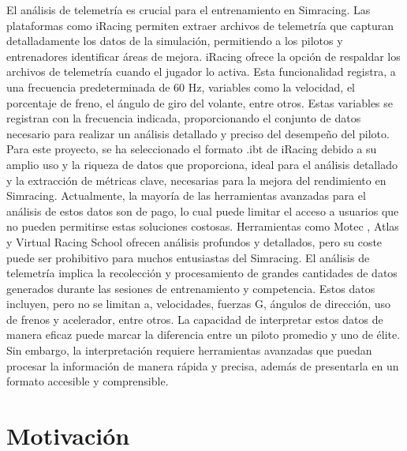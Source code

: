 El análisis de telemetría es crucial para el entrenamiento en Simracing. Las plataformas como iRacing permiten extraer archivos de telemetría que capturan detalladamente los datos de la simulación, permitiendo a los pilotos y entrenadores identificar áreas de mejora. iRacing ofrece la opción de respaldar los archivos de telemetría cuando el jugador lo activa. Esta funcionalidad registra, a una frecuencia predeterminada de 60 Hz, variables como la velocidad, el porcentaje de freno, el ángulo de giro del volante, entre otros. Estas variables se registran con la frecuencia indicada, proporcionando el conjunto de datos necesario para realizar un análisis detallado y preciso del desempeño del piloto.
Para este proyecto, se ha seleccionado el formato .ibt de iRacing debido a su amplio uso y la riqueza de datos que proporciona, ideal para el análisis detallado y la extracción de métricas clave, necesarias para la mejora del rendimiento en Simracing.
Actualmente, la mayoría de las herramientas avanzadas para el análisis de estos datos son de pago, lo cual puede limitar el acceso a usuarios que no pueden permitirse estas soluciones costosas. Herramientas como Motec \cite{motec}, Atlas \cite{atlas} y Virtual Racing School \cite{vrs} ofrecen análisis profundos y detallados, pero su coste puede ser prohibitivo para muchos entusiastas del Simracing.
El análisis de telemetría implica la recolección y procesamiento de grandes cantidades de datos generados durante las sesiones de entrenamiento y competencia. Estos datos incluyen, pero no se limitan a, velocidades, fuerzas G, ángulos de dirección, uso de frenos y acelerador, entre otros. La capacidad de interpretar estos datos de manera eficaz puede marcar la diferencia entre un piloto promedio y uno de élite. Sin embargo, la interpretación requiere herramientas avanzadas que puedan procesar la información de manera rápida y precisa, además de presentarla en un formato accesible y comprensible.


\section{Motivación}

